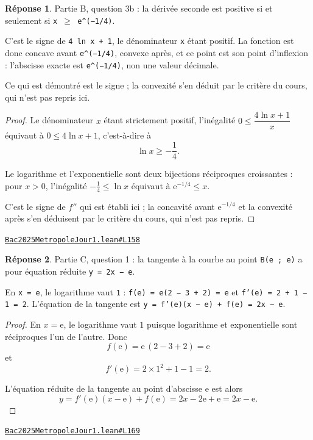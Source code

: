 \documentclass[11pt,a4paper]{article}
\theoremstyle{definition}
\theoremstyle{plain}
\theoremstyle{definition}
\newtheorem*{reponse}{Réponse}
\newcommand{\source}[2]{\par\smallskip\noindent\hfill{\footnotesize\href{#1}{\texttt{#2}}}\par\smallskip}
\begin{document}
\begin{reponse}
Partie B, question 3b : la dérivée seconde est positive si et seulement si
\texttt{x \(\ge\) e\textasciicircum{}(−1/4)}.

C'est le signe de \texttt{4 ln x + 1}, le dénominateur \texttt{x} étant positif. La fonction est
donc concave avant \texttt{e\textasciicircum{}(−1/4)}, convexe après, et ce point est son point d'inflexion :
l'abscisse exacte est \texttt{e\textasciicircum{}(−1/4)}, non une valeur décimale.

Ce qui est démontré est le signe ; la convexité s'en déduit par le critère du cours,
qui n'est pas repris ici.
\end{reponse}
\begin{proof}
Le dénominateur $x$ étant strictement positif, l'inégalité $0 \le \dfrac{4 \ln x + 1}{x}$
équivaut à $0 \le 4 \ln x + 1$, c'est-à-dire à
\[ \ln x \ge -\frac{1}{4} . \]

Le logarithme et l'exponentielle sont deux bijections réciproques croissantes : pour
$x > 0$, l'inégalité $-\tfrac{1}{4} \le \ln x$ équivaut à $\mathrm{e}^{-1/4} \le x$.

C'est le signe de $f''$ qui est établi ici ; la concavité avant
$\mathrm{e}^{-1/4}$ et la convexité après s'en déduisent par le critère du cours, qui
n'est pas repris.
\end{proof}
\source{https://github.com/Commutator-IO/learn-lean/blob/main/exams/2025/Bac2025MetropoleJour1.lean\#L158}{Bac2025MetropoleJour1.lean\#L158}

\begin{reponse}
Partie C, question 1 : la tangente à la courbe au point \texttt{B(e ; e)} a pour
équation réduite \texttt{y = 2x − e}.

En \texttt{x = e}, le logarithme vaut \texttt{1} : \texttt{f(e) = e(2 − 3 + 2) = e} et
\texttt{f'(e) = 2 + 1 − 1 = 2}. L'équation de la tangente est
\texttt{y = f'(e)(x − e) + f(e) = 2x − e}.
\end{reponse}
\begin{proof}
En $x = \mathrm{e}$, le logarithme vaut $1$ puisque logarithme et exponentielle sont
réciproques l'un de l'autre. Donc
\[ f(\mathrm{e}) = \mathrm{e}\,(2 - 3 + 2) = \mathrm{e} \]
et
\[ f'(\mathrm{e}) = 2 \times 1^2 + 1 - 1 = 2 . \]

L'équation réduite de la tangente au point d'abscisse $\mathrm{e}$ est alors
\[ y = f'(\mathrm{e})(x - \mathrm{e}) + f(\mathrm{e}) = 2x - 2\mathrm{e} + \mathrm{e}
   = 2x - \mathrm{e} . \]
\end{proof}
\source{https://github.com/Commutator-IO/learn-lean/blob/main/exams/2025/Bac2025MetropoleJour1.lean\#L169}{Bac2025MetropoleJour1.lean\#L169}
\end{document}
